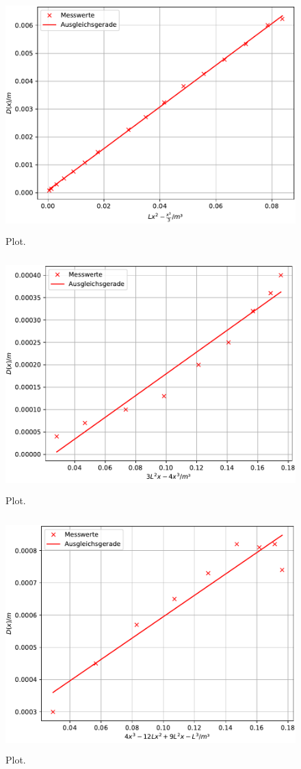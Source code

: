\begin{figure}
  \centering
  \includegraphics[width=12cm, height=9cm]{./plots/Stange2.pdf}
  \caption{Plot.}
  \label{fig:plot}
\end{figure}





\begin{figure}
  \centering
  \includegraphics[width=12cm, height=9cm]{./plots/Stange3a.pdf}
  \caption{Plot.}
  \label{fig:plot}
\end{figure}





\begin{figure}
  \centering
  \includegraphics[width=12cm, height=9cm]{./plots/Stange3b.pdf}
  \caption{Plot.}
  \label{fig:plot}
\end{figure}
